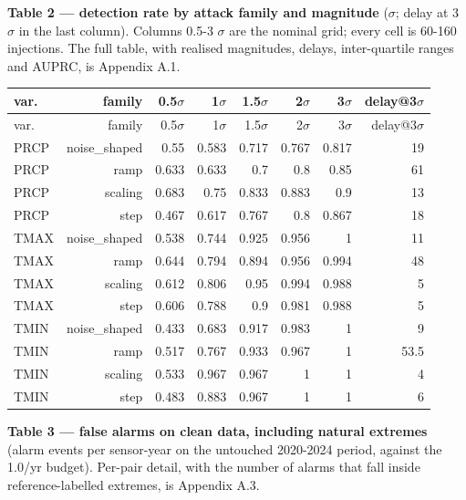 \documentclass[10pt,a4paper]{article}
\begin{document}
\textbf{Table 2 — detection rate by attack family and magnitude} ($\sigma$; delay at 3 $\sigma$ in the last column). Columns 0.5-\allowbreak{}3 $\sigma$ are the nominal grid; every cell is 60-\allowbreak{}160 injections. The full table, with realised magnitudes, delays, inter-\allowbreak{}quartile ranges and AUPRC, is Appendix A.1.

{\small
\setlength{\tabcolsep}{3pt}
\setlength{\LTleft}{\fill}
\setlength{\LTright}{\fill}
\begin{longtable}{lrrrrrrr}
\toprule
var. & family & 0.5$\sigma$ & 1$\sigma$ & 1.5$\sigma$ & 2$\sigma$ & 3$\sigma$ & delay@3$\sigma$ \\
\midrule
\endfirsthead
\toprule
var. & family & 0.5$\sigma$ & 1$\sigma$ & 1.5$\sigma$ & 2$\sigma$ & 3$\sigma$ & delay@3$\sigma$ \\
\midrule
\endhead
\bottomrule
\endlastfoot
PRCP & noise\_\allowbreak{}shaped & 0.55 & 0.583 & 0.717 & 0.767 & 0.817 & 19 \\
PRCP & ramp & 0.633 & 0.633 & 0.7 & 0.8 & 0.85 & 61 \\
PRCP & scaling & 0.683 & 0.75 & 0.833 & 0.883 & 0.9 & 13 \\
PRCP & step & 0.467 & 0.617 & 0.767 & 0.8 & 0.867 & 18 \\
TMAX & noise\_\allowbreak{}shaped & 0.538 & 0.744 & 0.925 & 0.956 & 1 & 11 \\
TMAX & ramp & 0.644 & 0.794 & 0.894 & 0.956 & 0.994 & 48 \\
TMAX & scaling & 0.612 & 0.806 & 0.95 & 0.994 & 0.988 & 5 \\
TMAX & step & 0.606 & 0.788 & 0.9 & 0.981 & 0.988 & 5 \\
TMIN & noise\_\allowbreak{}shaped & 0.433 & 0.683 & 0.917 & 0.983 & 1 & 9 \\
TMIN & ramp & 0.517 & 0.767 & 0.933 & 0.967 & 1 & 53.5 \\
TMIN & scaling & 0.533 & 0.967 & 0.967 & 1 & 1 & 4 \\
TMIN & step & 0.483 & 0.883 & 0.967 & 1 & 1 & 6 \\
\end{longtable}
}

\textbf{Table 3 — false alarms on clean data, including natural extremes} (alarm events per sensor-\allowbreak{}year on the untouched 2020-\allowbreak{}2024 period, against the 1.0/\allowbreak{}yr budget). Per-\allowbreak{}pair detail, with the number of alarms that fall inside reference-\allowbreak{}labelled extremes, is Appendix A.3.
\end{document}
